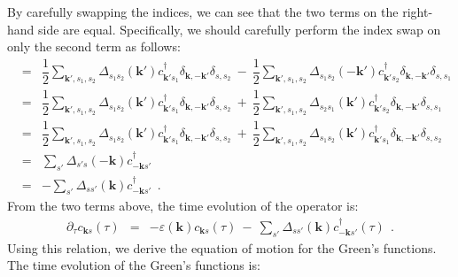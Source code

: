 \documentclass[a4j]{jsarticle}
\begin{document}
%
%
%
%
By carefully swapping the indices, we can see that the two terms on the right-hand side are equal.
Specifically, we should carefully perform the index swap on only the second term as follows:
%
%
%
%
\begin{eqnarray}
	[ \mathcal{H}_{\rm BCS} \ , \ c_{\bm{k}s} ]
	&=&
	\dfrac{1}{2}
	\sum_{\bm{k}',s_{1},s_{2}}
	\Delta_{ s_{1} s_{2} }( \bm{k}' )
	c_{\bm{k}' s_{1}}^{\dagger}
	\delta_{\bm{k},-\bm{k}'}
	\delta_{s,s_{2}}
	\ - \
	\dfrac{1}{2}
	\sum_{\bm{k}',s_{1},s_{2}}
	\Delta_{ s_{1} s_{2} }( - \bm{k}' )
	c_{\bm{k}' s_{2}}^{\dagger}
	\delta_{\bm{k},-\bm{k}'}
	\delta_{s,s_{1}}
	\nonumber \\[2mm] &=&
	\dfrac{1}{2}
	\sum_{\bm{k}',s_{1},s_{2}}
	\Delta_{ s_{1} s_{2} }( \bm{k}' )
	c_{\bm{k}' s_{1}}^{\dagger}
	\delta_{\bm{k},-\bm{k}'}
	\delta_{s,s_{2}}
	\ + \
	\dfrac{1}{2}
	\sum_{\bm{k}',s_{1},s_{2}}
	\Delta_{ s_{2} s_{1} }( \bm{k}' )
	c_{\bm{k}' s_{2}}^{\dagger}
	\delta_{\bm{k},-\bm{k}'}
	\delta_{s,s_{1}}
	\nonumber \\[2mm] &=&
	\dfrac{1}{2}
	\sum_{\bm{k}',s_{1},s_{2}}
	\Delta_{ s_{1} s_{2} }( \bm{k}' )
	c_{\bm{k}' s_{1}}^{\dagger}
	\delta_{\bm{k},-\bm{k}'}
	\delta_{s,s_{2}}
	\ + \
	\dfrac{1}{2}
	\sum_{\bm{k}',s_{1},s_{2}}
	\Delta_{ s_{1} s_{2} }( \bm{k}' )
	c_{\bm{k}' s_{1}}^{\dagger}
	\delta_{\bm{k},-\bm{k}'}
	\delta_{s,s_{2}}
	\nonumber \\[2mm] &=&
	\sum_{ s' }
	\Delta_{ s' s }( - \bm{k} )
	c_{ - \bm{k} s'}^{\dagger}
	\nonumber \\[2mm] &=&
	-
	\sum_{ s' }
	\Delta_{ s s' }( \bm{k} )
	c_{ - \bm{k} s'}^{\dagger}
	\ \ .
\end{eqnarray}
%
%
%
%
From the two terms above, the time evolution of the operator is:
%
%
%
%
\begin{eqnarray}
	\partial_{\tau}
	c_{\bm{k}s} (\tau)
	&=&
	-
	\varepsilon( \bm{k} )
	c_{\bm{k} s} (\tau)
	\ - \
	\sum_{ s' }
	\Delta_{ s s' }( \bm{k} )
	c_{ - \bm{k} s'}^{\dagger} ( \tau )
	\ \ .
	\label{eqn:enzansihattenntime}
\end{eqnarray}
%
%
%
%
Using this relation, we derive the equation of motion for the Green's functions.
The time evolution of the Green's functions is:
%
%
%
%
\end{document}
